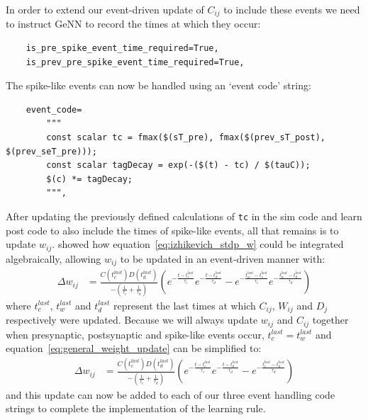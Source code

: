 \documentclass[utf8]{frontiersSCNS} %
\begin{document}
%
In order to extend our event-driven update of $C_{ij}$ to include these events we need to instruct GeNN to record the times at which they occur:
%
\begin{lstlisting}
    is_pre_spike_event_time_required=True,
    is_prev_pre_spike_event_time_required=True,
\end{lstlisting}
%
The spike-like events can now be handled using an `event code' string:
%
\begin{lstlisting}
    event_code=
        """
        const scalar tc = fmax($(sT_pre), fmax($(prev_sT_post), $(prev_seT_pre)));
        const scalar tagDecay = exp(-($(t) - tc) / $(tauC));
        $(c) *= tagDecay;
        """,
\end{lstlisting}
%
After updating the previously defined calculations of \lstinline{tc} in the sim code and learn post code to also include the times of spike-like events, all that remains is to update $w_{ij}$.
\citet{Mikaitis2018} showed how equation~\ref{eq:izhikevich_stdp_w} could be integrated algebraically, allowing $w_{ij}$ to be updated in an event-driven manner with:
%
\begin{align}
    \Delta w_{ij} & = \frac{C(t_{c}^{last}) D(t_{d}^{last})}{-\left(\frac{1}{\tau_c} + \frac{1}{\tau_d}\right)} \left(e ^{-\frac{t - t_{c}^{last}}{\tau_c}} e ^{-\frac{t - t_{d}^{last}}{\tau_d}} - e ^{-\frac{t_{w}^{last} - t_{c}^{last}}{\tau_c}} e ^{-\frac{t_{w}^{last} - t_{d}^{last}}{\tau_d}}\right) \label{eq:general_weight_update}
\end{align}
%
where $t_{c}^{last}$, $t_{w}^{last}$ and $t_{d}^{last}$ represent the last times at which $C_{ij}$, $W_{ij}$ and $D_{j}$ respectively were updated.
Because we will always update $w_{ij}$ and $C_{ij}$ together when presynaptic, postsynaptic and spike-like events occur, $t_{c}^{last} = t_{w}^{last}$ and equation~\ref{eq:general_weight_update} can be simplified to:
%
\begin{align}
    \Delta w_{ij} & = \frac{C(t_{c}^{last}) D(t_{d}^{last})}{-\left(\frac{1}{\tau_c} + \frac{1}{\tau_d}\right)} \left(e ^{-\frac{t - t_{c}^{last}}{\tau_c}} e ^{-\frac{t - t_{d}^{last}}{\tau_d}} - e ^{-\frac{t_{c}^{last} - t_{d}^{last}}{\tau_d}}\right) \label{eq:general_weight_update}
\end{align}
%
and this update can now  be added to each of our three event handling code strings to complete the implementation of the learning rule.
\end{document}
